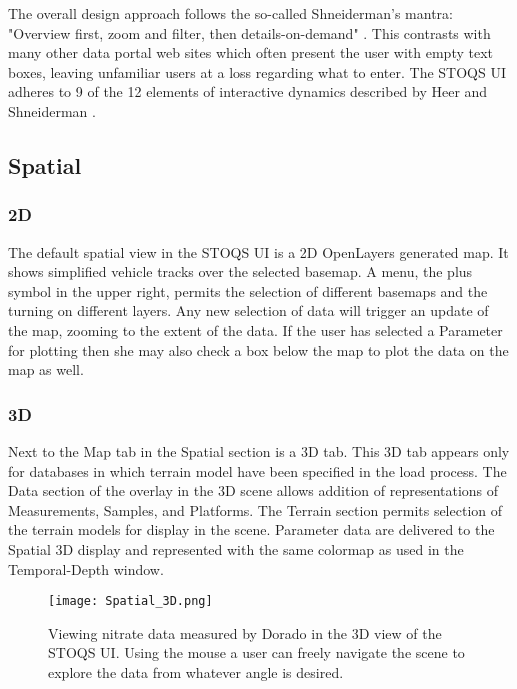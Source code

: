 \documentclass[conference]{IEEEtran}
\begin{document}
The overall design approach follows the so-called Shneiderman's mantra: "Overview first, 
zoom and filter, then details-on-demand" \cite{Whitney:2012:DIN:2597850}. This contrasts 
with many other data portal web sites which often present the user with empty text boxes, 
leaving unfamiliar users at a loss regarding what to enter. The STOQS UI adheres to 9 
of the 12 elements of interactive dynamics described by Heer and Shneiderman 
\cite{Heer:2012:IDV:2133416.2146416}.


\subsection{Spatial}

\subsubsection{2D}
The default spatial view in the STOQS UI is a 2D OpenLayers generated map. It shows 
simplified vehicle tracks over the selected basemap. A menu, the plus symbol
in the upper right, permits the selection of different basemaps and the turning
on different layers. Any new selection of data will trigger an update
of the map, zooming to the extent of the data. If the user has selected a Parameter for plotting
then she may also check a box below the map to plot the data on the map as well.

\subsubsection{3D}
Next to the Map tab in the Spatial section is a 3D tab. This 3D tab appears 
only for databases in which terrain model have been specified in the load process. 
The Data section of
the overlay in the 3D scene allows addition of representations of Measurements,
Samples, and Platforms. The Terrain section permits selection of the terrain
models for display in the scene.
Parameter data are delivered to the Spatial 3D display and represented with the same
colormap as used in the Temporal-Depth window.

\begin{figure}[htbp]
\centering
\texttt{[image: Spatial\_3D.png]}
\caption{Viewing nitrate data measured by Dorado in the 3D view of the STOQS UI.
Using the mouse a user can freely navigate the scene to explore the data from 
whatever angle is desired.}
\label{fig:Spatial_3D}
\end{figure}
\end{document}
